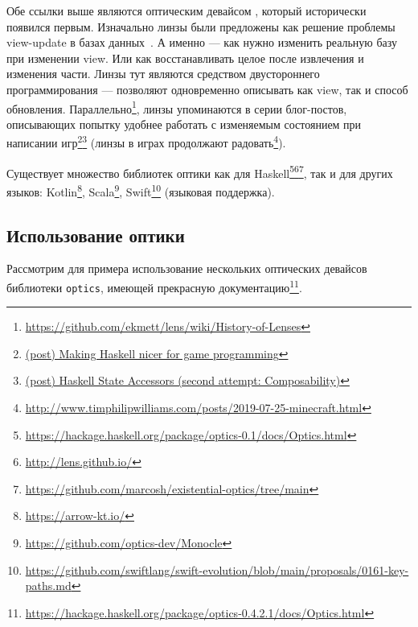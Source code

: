 Обе ссылки выше являются оптическим девайсом , который исторически появился первым.
Изначально линзы были предложены как решение проблемы view-update в базах данных~\cite{bohannon2006relational, foster2008quotient}.
А именно --- как нужно изменить реальную базу при изменении view.
Или как восстанавливать целое после извлечения и изменения части.
Линзы тут являются средством двустороннего программирования --- позволяют одновременно описывать как view, так и способ обновления.
Параллельно\footnote{\url{https://github.com/ekmett/lens/wiki/History-of-Lenses}}, линзы упоминаются в серии блог-постов, описывающих попытку удобнее работать с изменяемым состоянием при написании игр\footnote{\href{https://web.archive.org/web/20140402193032/https://lukepalmer.wordpress.com/2007/07/26/making-haskell-nicer-for-game-programming/}{(post) Making Haskell nicer for game programming}}\footnote{\href{https://web.archive.org/web/20120303223802/https://lukepalmer.wordpress.com/2007/08/05/haskell-state-accessors-second-attempt-composability/}{(post) Haskell State Accessors (second attempt: Composability)}} (линзы в играх продолжают радовать\footnote{\url{http://www.timphilipwilliams.com/posts/2019-07-25-minecraft.html}}).

Существует множество библиотек оптики как для Haskell\footnote{\url{https://hackage.haskell.org/package/optics-0.1/docs/Optics.html}}\footnote{\url{http://lens.github.io/}}\footnote{\url{https://github.com/marcosh/existential-optics/tree/main}}, так и для других языков: Kotlin\footnote{\url{https://arrow-kt.io/}}, Scala\footnote{\url{https://github.com/optics-dev/Monocle}}, Swift\footnote{\url{https://github.com/swiftlang/swift-evolution/blob/main/proposals/0161-key-paths.md}} (языковая поддержка).

\subsection{Использование оптики}

Рассмотрим для примера использование нескольких оптических девайсов библиотеки \texttt{optics}, имеющей прекрасную документацию\footnote{\url{https://hackage.haskell.org/package/optics-0.4.2.1/docs/Optics.html}}.


